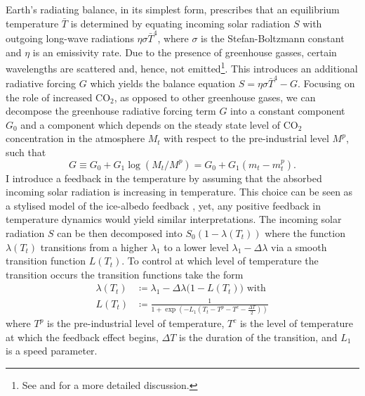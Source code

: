 \documentclass[../../main.tex]{subfiles}
\begin{document}
Earth's radiating balance, in its simplest form, prescribes that an equilibrium temperature $\bar{T}$ is determined by equating incoming solar radiation $S$ with outgoing long-wave radiations $\eta \sigma \bar{T}^4$, where $\sigma$ is the Stefan-Boltzmann constant and $\eta$ is an emissivity rate. Due to the presence of greenhouse gasses, certain wavelengths are scattered and, hence, not emitted\footnote{See \cite{ghil_topics_2012} and \cite{greiner_economic_2005} for a more detailed discussion.}. This introduces an additional radiative forcing $G$ which yields the balance equation $S = \eta \sigma \bar{T}^4 - G$. Focusing on the role of increased CO$_2$, as opposed to other greenhouse gases, we can decompose the greenhouse radiative forcing term $G$ into a constant component $G_0$ and a component which depends on the steady state level of CO$_2$ concentration in the atmosphere $M_t$ with respect to the pre-industrial level $M^p$, such that \begin{equation}
    G \equiv G_0 + G_1 \log(M_t / M^p) = G_0 + G_1 \left(m_t - m^p_t\right).
\end{equation} I introduce a feedback in the temperature by assuming that the absorbed incoming solar radiation is increasing in temperature. This choice can be seen as a stylised model of the ice-albedo feedback \citep{mcguffie_climate_2005, ashwin_tipping_2012}, yet, any positive feedback in temperature dynamics would yield similar interpretations. 
The incoming solar radiation $S$ can be then decomposed into $S_0 \left(1 - \lambda(T_t)\right)$ where the function $\lambda(T_t)$ transitions from a higher $\lambda_1$ to a lower level $\lambda_1 - \Delta \lambda$ via a smooth transition function $L(T_t)$. To control at which level of temperature the transition occurs the transition functions take the form \begin{subequations} \label{eq:albedo-specification}
    \begin{align}
        \lambda(T_t) &\coloneqq \lambda_1 - \Delta \lambda \big(1 - L(T_t)\big) \text{ with } \label{eq:lambda} \\
        L(T_t) &\coloneqq \frac{1}{1 + \exp \left(-L_1 \left(T_t - T^p - T^c - \frac{\Delta T}{2}\right)\right)}
    \end{align} 
\end{subequations} where $T^p$ is the pre-industrial level of temperature, $T^c$ is the level of temperature at which the feedback effect begins, $\Delta T$ is the duration of the transition, and $L_1$ is a speed parameter. 
\end{document}
